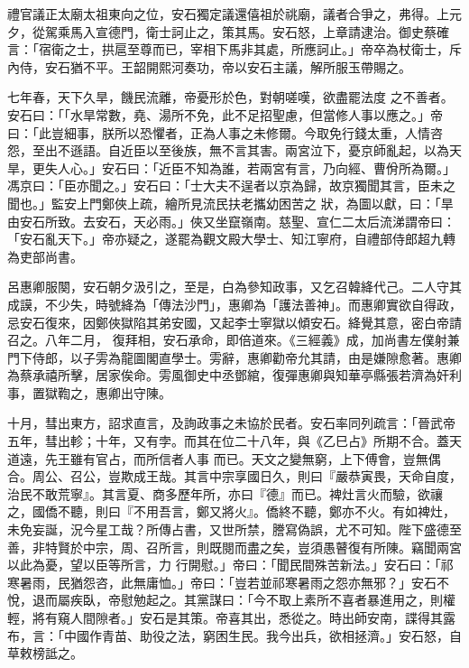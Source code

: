 \begin{pinyinscope}
 禮官議正太廟太祖東向之位，安石獨定議還僖祖於祧廟，議者合爭之，弗得。上元夕，從駕乘馬入宣德門，衛士訶止之，策其馬。安石怒，上章請逮治。御史蔡確言：「宿衛之士，拱扈至尊而已，宰相下馬非其處，所應訶止。」帝卒為杖衛士，斥內侍，安石猶不平。王韶開熙河奏功，帝以安石主議，解所服玉帶賜之。



 七年春，天下久旱，饑民流離，帝憂形於色，對朝嗟嘆，欲盡罷法度
 之不善者。安石曰：「「水旱常數，堯、湯所不免，此不足招聖慮，但當修人事以應之。」帝曰：「此豈細事，朕所以恐懼者，正為人事之未修爾。今取免行錢太重，人情咨怨，至出不遜語。自近臣以至後族，無不言其害。兩宮泣下，憂京師亂起，以為天旱，更失人心。」安石曰：「近臣不知為誰，若兩宮有言，乃向經、曹佾所為爾。」馮京曰：「臣亦聞之。」安石曰：「士大夫不逞者以京為歸，故京獨聞其言，臣未之聞也。」監安上門鄭俠上疏，繪所見流民扶老攜幼困苦之
 狀，為圖以獻，曰：「旱由安石所致。去安石，天必雨。」俠又坐竄嶺南。慈聖、宣仁二太后流涕謂帝曰：「安石亂天下。」帝亦疑之，遂罷為觀文殿大學士、知江寧府，自禮部侍郎超九轉為吏部尚書。



 呂惠卿服闋，安石朝夕汲引之，至是，白為參知政事，又乞召韓絳代己。二人守其成謨，不少失，時號絳為「傳法沙門」，惠卿為「護法善神」。而惠卿實欲自得政，忌安石復來，因鄭俠獄陷其弟安國，又起李士寧獄以傾安石。絳覺其意，密白帝請召之。八年二月，
 復拜相，安石承命，即倍道來。《三經義》成，加尚書左僕射兼門下侍郎，以子雱為龍圖閣直學士。雱辭，惠卿勸帝允其請，由是嫌隙愈著。惠卿為蔡承禧所擊，居家俟命。雱風御史中丞鄧綰，復彈惠卿與知華亭縣張若濟為奸利事，置獄鞫之，惠卿出守陳。



 十月，彗出東方，詔求直言，及詢政事之未協於民者。安石率同列疏言：「晉武帝五年，彗出軫；十年，又有孛。而其在位二十八年，與《乙巳占》所期不合。蓋天道遠，先王雖有官占，而所信者人事
 而已。天文之變無窮，上下傅會，豈無偶合。周公、召公，豈欺成王哉。其言中宗享國日久，則曰『嚴恭寅畏，天命自度，治民不敢荒寧』。其言夏、商多歷年所，亦曰『德』而已。裨灶言火而驗，欲禳之，國僑不聽，則曰『不用吾言，鄭又將火』。僑終不聽，鄭亦不火。有如裨灶，未免妄誕，況今星工哉？所傳占書，又世所禁，謄寫偽誤，尤不可知。陛下盛德至善，非特賢於中宗，周、召所言，則既閱而盡之矣，豈須愚瞽復有所陳。竊聞兩宮以此為憂，望以臣等所言，力
 行開慰。」帝曰：「聞民間殊苦新法。」安石曰：「祁寒暑雨，民猶怨咨，此無庸恤。」帝曰：「豈若並祁寒暑雨之怨亦無邪？」安石不悅，退而屬疾臥，帝慰勉起之。其黨謀曰：「今不取上素所不喜者暴進用之，則權輕，將有窺人間隙者。」安石是其策。帝喜其出，悉從之。時出師安南，諜得其露布，言：「中國作青苗、助役之法，窮困生民。我今出兵，欲相拯濟。」安石怒，自草敕榜詆之。




\end{pinyinscope}
